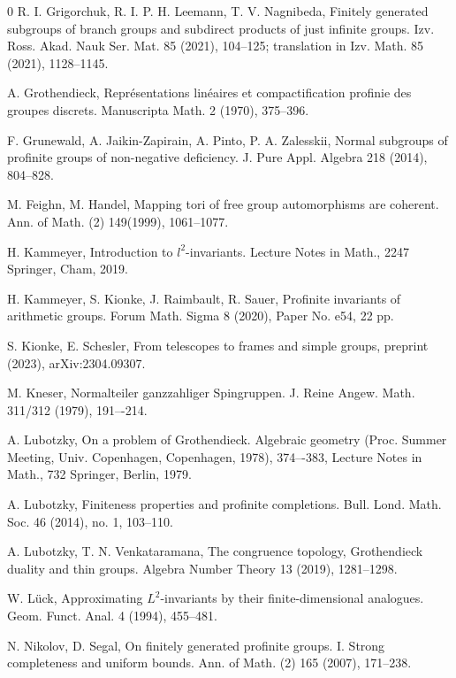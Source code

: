 \documentclass{amsart}
\theoremstyle{definition}
\theoremstyle{remark}
\begin{document}
\begin{thebibliography}{0}
 R. I. Grigorchuk, R. I. P. H.  Leemann,  T. V.  Nagnibeda, 
Finitely generated subgroups of branch groups and subdirect products of just infinite groups. 
Izv. Ross. Akad. Nauk Ser. Mat. 85 (2021),  104--125; translation in
Izv. Math. 85 (2021),  1128--1145.


 A. Grothendieck, 
Repr\'esentations linéaires et compactification profinie des groupes discrets. Manuscripta Math. 2 (1970), 375--396. 

 F. Grunewald, A. Jaikin-Zapirain, A. Pinto, P. A. Zalesskii,
Normal subgroups of profinite groups of non-negative deficiency. J. Pure Appl. Algebra 218 (2014),  804--828.

 M. Feighn,  M. Handel,  
Mapping tori of free group automorphisms are coherent.
Ann. of Math. (2) 149(1999),  1061–1077.

 H. Kammeyer,  
Introduction to $l^2$-invariants.
Lecture Notes in Math., 2247
Springer, Cham, 2019.

H. Kammeyer, S. Kionke, J. Raimbault, R.  Sauer,  
Profinite invariants of arithmetic groups. Forum Math. Sigma 8 (2020), Paper No. e54, 22 pp.

 S.  Kionke, E.  Schesler, From telescopes to frames and simple groups, preprint (2023), arXiv:2304.09307.

 M. Kneser, 
Normalteiler ganzzahliger Spingruppen. J. Reine Angew. Math. 311/312 (1979), 191–-214.

 A. Lubotzky, 
On a problem of Grothendieck. Algebraic geometry (Proc. Summer Meeting, Univ. Copenhagen, Copenhagen, 1978),  374–-383,
Lecture Notes in Math., 732
Springer, Berlin, 1979.

  A. Lubotzky,   Finiteness properties and profinite completions. Bull. Lond. Math. Soc. 46 (2014), no. 1, 103--110. 



 A. Lubotzky,   T. N. Venkataramana, 
The congruence topology, Grothendieck duality and thin groups. Algebra Number Theory 13 (2019),  1281--1298.

 W. L\"uck, 
Approximating $L^2$-invariants by their finite-dimensional analogues. Geom. Funct. Anal. 4 (1994),  455--481.

 N. Nikolov,  D. Segal,  
On finitely generated profinite groups. I. Strong completeness and uniform bounds.  Ann. of Math. (2) 165 (2007),  171--238.


\end{thebibliography}
\end{document}
